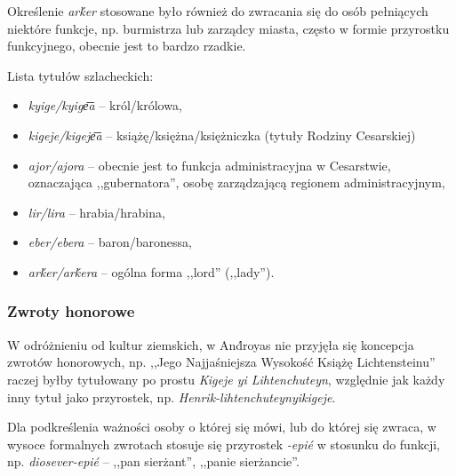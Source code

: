 \begin{spacing}{1.1}


Określenie \emph{arḱer} stosowane było również do zwracania się do osób
pełniących niektóre funkcje, np. burmistrza lub zarządcy miasta, często w formie
przyrostku funkcyjnego, obecnie jest to bardzo rzadkie.

Lista tytułów szlacheckich:

\begin{itemize}
	\item \emph{kyige/kyige͞a} -- król/królowa,
	\item \emph{kigeje/kigeje͞a} -- książę/księżna/księżniczka (tytuły Rodziny
	Cesarskiej)
	\item \emph{ajor/ajora} -- obecnie jest to funkcja administracyjna w
	Cesarstwie, oznaczająca ,,gubernatora'', osobę zarządzającą regionem
	administracyjnym,
	\item \emph{lir/lira} -- hrabia/hrabina,
	\item \emph{eber/ebera} -- baron/baronessa,	
	\item \emph{arḱer/arḱera} -- ogólna forma ,,lord'' (,,lady'').
\end{itemize}

\subsubsection{Zwroty honorowe}

W odróżnieniu od kultur ziemskich, w And́royas nie przyjęła się koncepcja
zwrotów honorowych, np. ,,Jego Najjaśniejsza Wysokość Książę Lichtensteinu''
raczej byłby tytułowany po prostu \emph{Kigeje yi Lihtenchuteyn}, względnie jak
każdy inny tytuł jako przyrostek, np. \emph{Henrik-lihtenchuteynyikigeje}.

Dla podkreślenia ważności osoby o której się mówi, lub do której się zwraca, w
wysoce formalnych zwrotach stosuje się przyrostek \emph{-epié} w stosunku do
funkcji, np. \emph{diosever-epié} -- ,,pan sierżant'', ,,panie sierżancie''.



\end{spacing}
